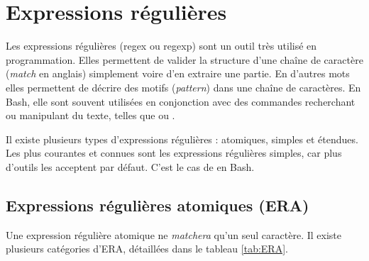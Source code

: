 \section{Expressions régulières} \label{sec:regex}

Les expressions régulières (regex ou regexp) sont un outil très utilisé en programmation. Elles permettent de valider la structure d'une chaîne de caractère (\textit{match} en anglais) simplement voire d'en extraire une partie. En d'autres mots elles permettent de décrire des motifs (\textit{pattern}) dans une chaîne de caractères. En Bash, elle sont souvent utilisées en conjonction avec des commandes recherchant ou manipulant du texte, telles que  ou .

Il existe plusieurs types d'expressions régulières : atomiques, simples et étendues. Les plus courantes et connues sont les expressions régulières simples, car plus d'outils les acceptent par défaut. C'est le cas de  en Bash.


\subsection{Expressions régulières atomiques (ERA)}
Une expression régulière atomique ne \textit{matchera} qu'un seul caractère. Il existe plusieurs catégories d'ERA, détaillées dans le tableau \ref{tab:ERA}.

